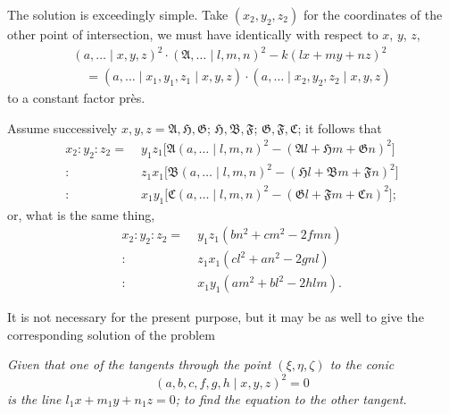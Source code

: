 \documentclass[11pt,a4paper]{article}
\begin{document}
\medskip

The solution is exceedingly simple. Take $(x_2, y_2, z_2)$ for the coordinates of the other point of intersection, we must have identically with respect to $x$, $y$, $z$,
\begin{align*}
(a, \ldots \mid x, y, z)^2 \cdot (\mathfrak{A}, \ldots \mid l, m, n)^2 - k(lx + my + nz)^2 \\
\quad = (a, \ldots \mid x_1, y_1, z_1 \mid x, y, z)\cdot(a, \ldots \mid x_2, y_2, z_2 \mid x, y, z)
\end{align*}
to a constant factor pr\`es.

\medskip

Assume successively $x, y, z = \mathfrak{A}, \mathfrak{H}, \mathfrak{G}$; $\mathfrak{H}, \mathfrak{B}, \mathfrak{F}$; $\mathfrak{G}, \mathfrak{F}, \mathfrak{C}$; it follows that
\begin{align*}
x_2 : y_2 : z_2 = \;& y_1 z_1 \bigl[ \mathfrak{A}(a, \ldots \mid l, m, n)^2 - (\mathfrak{A}l + \mathfrak{H}m + \mathfrak{G}n)^2 \bigr]\\
:\;& z_1 x_1 \bigl[ \mathfrak{B}(a, \ldots \mid l, m, n)^2 - (\mathfrak{H}l + \mathfrak{B}m + \mathfrak{F}n)^2 \bigr]\\
:\;& x_1 y_1 \bigl[ \mathfrak{C}(a, \ldots \mid l, m, n)^2 - (\mathfrak{G}l + \mathfrak{F}m + \mathfrak{C}n)^2 \bigr];
\end{align*}
or, what is the same thing,
\begin{align*}
x_2 : y_2 : z_2 = \;& y_1 z_1 (bn^2 + cm^2 - 2fmn)\\
:\;& z_1 x_1 (cl^2 + an^2 - 2gnl)\\
:\;& x_1 y_1 (am^2 + bl^2 - 2hlm).
\end{align*}

\medskip

It is not necessary for the present purpose, but it may be as well to give the corresponding solution of the problem

\medskip

\textit{Given that one of the tangents through the point $(\xi, \eta, \zeta)$ to the conic}
\[ (a, b, c, f, g, h \mid x, y, z)^2 = 0 \]
\textit{is the line $l_1 x + m_1 y + n_1 z = 0$; to find the equation to the other tangent.}

\medskip
\end{document}

